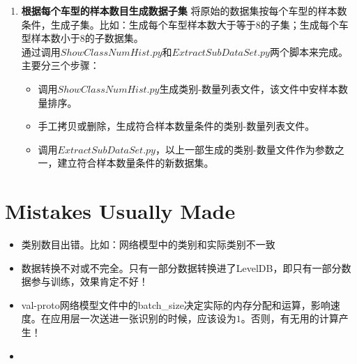 \documentclass{article}
\begin{document}
\begin{CJK}{UTF8}{gbsn}
\begin{enumerate}
     \item \textbf{根据每个车型的样本数目生成数据子集} 将原始的数据集按每个车型的样本数条件，生成子集。比如：生成每个车型样本数大于等于8的子集；生成每个车型样本数小于8的子数据集。\\
       通过调用$ShowClassNumHist.py$和$ExtractSubDataSet.py$两个脚本来完成。主要分三个步骤：\\
       \begin{itemize}
       \item 调用$ShowClassNumHist.py$生成类别-数量列表文件，该文件中安样本数量排序。
       \item 手工拷贝或删除，生成符合样本数量条件的类别-数量列表文件。
       \item 调用$ExtractSubDataSet.py$，以上一部生成的类别-数量文件作为参数之一，建立符合样本数量条件的新数据集。
       \end{itemize}
       

\end{enumerate}

\section{Mistakes Usually Made}
\begin{itemize}
\item 类别数目出错。比如：网络模型中的类别和实际类别不一致
\item 数据转换不对或不完全。只有一部分数据转换进了LevelDB，即只有一部分数据参与训练，效果肯定不好！
\item val-proto网络模型文件中的batch\_size决定实际的内存分配和运算，影响速度。在应用层一次送进一张识别的时候，应该设为$1$。否则，有无用的计算产生！
\item 

\end{itemize}


\end{CJK}
\end{document}
